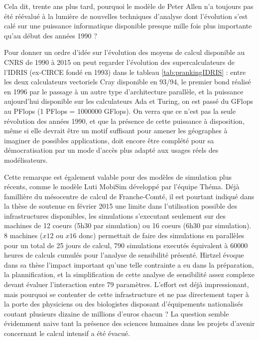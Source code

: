 Cela dit, trente ans plus tard, pourquoi le modèle de Peter Allen n'a toujours pas été réévalué à la lumière de nouvelles techniques d'analyse dont l'évolution s'est calé sur une puissance informatique disponible presque mille fois plus importante qu'au début des années 1990 ? 

Pour donner un ordre d'idée sur l'évolution des moyens de calcul disponible au CNRS de 1990 à 2015 on peut regarder l'évolution des supercalculateurs de l'IDRIS (ex-CIRCE fondé en 1993) dans le tableau \ref{tab:prankingIDRIS} : entre les deux calculateurs vectoriels Cray disponible en 93/94, le premier bond réalisé en 1996 par le passage à un autre type d'architecture parallèle, et la puissance aujourd'hui disponible sur les calculateurs Ada et Turing, on est passé du GFlops au PFlops (1 PFlops = 1000000 GFlops). On verra que ce n'est pas la seule révolution des années 1990, et que la présence de cette puissance à disposition, même si elle devrait être un motif suffisant pour amener les géographes à imaginer de possibles applications, doit encore être complété pour sa démocratisation par un mode d'accès plus adapté aux usages réels des modélisateurs.

Cette remarque est également valable pour des modèles de simulation plus récents, comme le modèle Luti MobiSim développé par l'équipe Théma. Déjà famillière du mésocentre de calcul de Franche-Comté, il est pourtant indiqué dans la thèse de \textcite{Hirtzel2015} soutenue en février 2015 une limite dans l'utilisation possible des infrastructures disponibles, les simulations s'executant seulement sur des machines de 12 coeurs (5h30 par simulation) ou 16 coeurs (6h30 par simulation). 8 machines ($ x 12$ ou $ x 16$ donc) permettait de faire des simulations en parallèles pour un total de 25 jours de calcul, 790 simulations executés équivalent à 60000 heures de calculs cumulés pour l'analyse de sensibilité présenté. Hirtzel évoque dans sa thèse l'impact important qu'une telle contrainte a eu dans la préparation, la plannification, et la simplification de cette analyse de sensibilité assez complexe devant évaluer l'interaction entre 79 paramètres. L'effort est déjà impressionant, mais pourquoi se contenter de cette infrastructure et ne pas directement taper à la porte des physiciens ou des biologistes disposant d'équipements nationalisés coutant plusieurs dizaine de millions d'euros chacun ? La question semble évidemment naive tant la présence des sciences humaines dans les projets d'avenir concernant le calcul intensif a été évacué.

